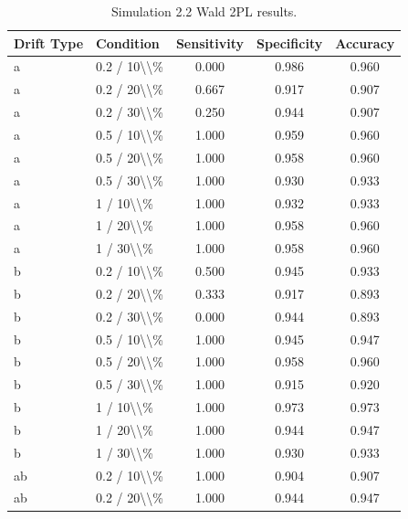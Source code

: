 \begin{table}[!h]
\centering
\caption{\label{tab:tab:sim22_2pl}Simulation 2.2 Wald 2PL results.}
\centering
\begin{tabular}[t]{llccc}
\toprule
Drift Type & Condition & Sensitivity & Specificity & Accuracy\\
\midrule
a & 0.2 / 10\textbackslash{}\textbackslash{}\% & 0.000 & 0.986 & 0.960\\
a & 0.2 / 20\textbackslash{}\textbackslash{}\% & 0.667 & 0.917 & 0.907\\
a & 0.2 / 30\textbackslash{}\textbackslash{}\% & 0.250 & 0.944 & 0.907\\
a & 0.5 / 10\textbackslash{}\textbackslash{}\% & 1.000 & 0.959 & 0.960\\
a & 0.5 / 20\textbackslash{}\textbackslash{}\% & 1.000 & 0.958 & 0.960\\
\addlinespace
a & 0.5 / 30\textbackslash{}\textbackslash{}\% & 1.000 & 0.930 & 0.933\\
a & 1 / 10\textbackslash{}\textbackslash{}\% & 1.000 & 0.932 & 0.933\\
a & 1 / 20\textbackslash{}\textbackslash{}\% & 1.000 & 0.958 & 0.960\\
a & 1 / 30\textbackslash{}\textbackslash{}\% & 1.000 & 0.958 & 0.960\\
b & 0.2 / 10\textbackslash{}\textbackslash{}\% & 0.500 & 0.945 & 0.933\\
\addlinespace
b & 0.2 / 20\textbackslash{}\textbackslash{}\% & 0.333 & 0.917 & 0.893\\
b & 0.2 / 30\textbackslash{}\textbackslash{}\% & 0.000 & 0.944 & 0.893\\
b & 0.5 / 10\textbackslash{}\textbackslash{}\% & 1.000 & 0.945 & 0.947\\
b & 0.5 / 20\textbackslash{}\textbackslash{}\% & 1.000 & 0.958 & 0.960\\
b & 0.5 / 30\textbackslash{}\textbackslash{}\% & 1.000 & 0.915 & 0.920\\
\addlinespace
b & 1 / 10\textbackslash{}\textbackslash{}\% & 1.000 & 0.973 & 0.973\\
b & 1 / 20\textbackslash{}\textbackslash{}\% & 1.000 & 0.944 & 0.947\\
b & 1 / 30\textbackslash{}\textbackslash{}\% & 1.000 & 0.930 & 0.933\\
ab & 0.2 / 10\textbackslash{}\textbackslash{}\% & 1.000 & 0.904 & 0.907\\
ab & 0.2 / 20\textbackslash{}\textbackslash{}\% & 1.000 & 0.944 & 0.947\\

\end{tabular}
\end{table}
